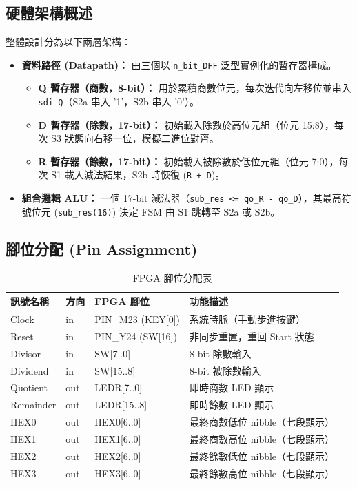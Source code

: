 \documentclass[12pt, a4paper]{article}
\begin{document}
\subsection{硬體架構概述}

整體設計分為以下兩層架構：

\begin{itemize}
    \item \textbf{資料路徑 (Datapath)：} 由三個以 \texttt{n\_bit\_DFF} 泛型實例化的暫存器構成。
    \begin{itemize}
        \item \textbf{Q 暫存器（商數，8-bit）：} 用於累積商數位元，每次迭代向左移位並串入 \texttt{sdi\_Q}（S2a 串入 '1'，S2b 串入 '0'）。
        \item \textbf{D 暫存器（除數，17-bit）：} 初始載入除數於高位元組（位元 15:8），每次 S3 狀態向右移一位，模擬二進位對齊。
        \item \textbf{R 暫存器（餘數，17-bit）：} 初始載入被除數於低位元組（位元 7:0），每次 S1 載入減法結果，S2b 時恢復 (\texttt{R + D})。
    \end{itemize}
    \item \textbf{組合邏輯 ALU：} 一個 17-bit 減法器（\texttt{sub\_res <= qo\_R - qo\_D}），其最高符號位元 (\texttt{sub\_res(16)}) 決定 FSM 由 S1 跳轉至 S2a 或 S2b。
\end{itemize}

\subsection{腳位分配 (Pin Assignment)}

\begin{table}[H]
    \centering
    \caption{FPGA 腳位分配表}
    \begin{tabular}{@{}llll@{}}
        \toprule
        \textbf{訊號名稱} & \textbf{方向} & \textbf{FPGA 腳位} & \textbf{功能描述} \\ \midrule
        Clock     & in  & PIN\_M23 (KEY[0])      & 系統時脈（手動步進按鍵） \\
        Reset     & in  & PIN\_Y24 (SW[16])      & 非同步重置，重回 Start 狀態 \\
        Divisor   & in  & SW[7..0]               & 8-bit 除數輸入 \\
        Dividend  & in  & SW[15..8]              & 8-bit 被除數輸入 \\
        Quotient  & out & LEDR[7..0]             & 即時商數 LED 顯示 \\
        Remainder & out & LEDR[15..8]            & 即時餘數 LED 顯示 \\
        HEX0      & out & HEX0[6..0]             & 最終商數低位 nibble（七段顯示）\\
        HEX1      & out & HEX1[6..0]             & 最終商數高位 nibble（七段顯示）\\
        HEX2      & out & HEX2[6..0]             & 最終餘數低位 nibble（七段顯示）\\
        HEX3      & out & HEX3[6..0]             & 最終餘數高位 nibble（七段顯示）\\ \bottomrule
    \end{tabular}
\end{table}
\end{document}
